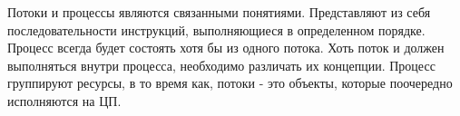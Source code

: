 Потоки и процессы являются связанными понятиями. Представляют из себя последовательности инструкций, выполняющиеся в определенном порядке. Процесс всегда будет состоять хотя бы из одного потока. Хоть поток и должен выполняться внутри процесса, необходимо различать их концепции. Процесс группируют ресурсы, в то время как, потоки - это объекты, которые поочередно исполняются на ЦП.
